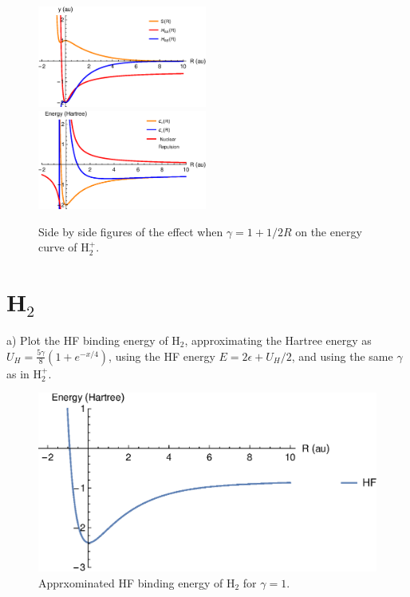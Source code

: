 \documentclass{article}
\begin{document}
\begin{figure}[H]
    \centering
    \includegraphics[width=0.495\textwidth]{h2_gamma.eps}
    \includegraphics[width=0.495\textwidth]{h2_gamma_curve.eps}
    \caption{Side by side figures of the effect when $\gamma= 1 + 1/2 R$
      on the energy curve of H$_2^+$.}
    \label{fig:sidebyside}
\end{figure}

\pagebreak

\section*{H$_2$}

\noindent a) Plot the HF binding energy of H$_2$, approximating the Hartree energy
as $U_H=\frac{5\gamma}{8}(1+e^{-x/4})$, using the HF energy $E=2\epsilon + U_H/2$,
and using the same $\gamma$ as in H$_2^+$.

\begin{figure}[H]
  \centering
  \includegraphics[scale=0.75]{hf_energy.eps}
  \caption{Apprxominated HF binding energy of H$_2$ for $\gamma=1$.}
\end{figure}
\end{document}
